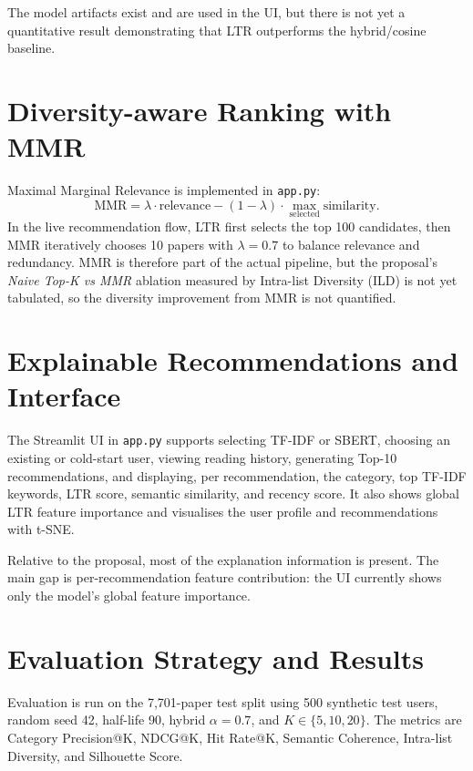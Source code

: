 \documentclass[12pt,a4paper]{article}
\begin{document}
The model artifacts exist and are used in the UI, but there is not yet a
quantitative result demonstrating that LTR outperforms the hybrid/cosine
baseline.

\section{Diversity-aware Ranking with MMR}

Maximal Marginal Relevance is implemented in \texttt{app.py}:
\begin{equation}
\text{MMR} = \lambda \cdot \text{relevance}
- (1-\lambda)\cdot \max_{\text{selected}} \text{similarity}.
\end{equation}
In the live recommendation flow, LTR first selects the top 100 candidates, then
MMR iteratively chooses 10 papers with $\lambda = 0.7$ to balance relevance and
redundancy. MMR is therefore part of the actual pipeline, but the proposal's
\emph{Naive Top-K vs MMR} ablation measured by Intra-list Diversity (ILD) is not
yet tabulated, so the diversity improvement from MMR is not quantified.

\section{Explainable Recommendations and Interface}

The Streamlit UI in \texttt{app.py} supports selecting TF-IDF or SBERT,
choosing an existing or cold-start user, viewing reading history, generating
Top-10 recommendations, and displaying, per recommendation, the category, top
TF-IDF keywords, LTR score, semantic similarity, and recency score. It also
shows global LTR feature importance and visualises the user profile and
recommendations with t-SNE.

Relative to the proposal, most of the explanation information is present. The
main gap is per-recommendation feature contribution: the UI currently shows
only the model's global feature importance.

\section{Evaluation Strategy and Results}

Evaluation is run on the 7{,}701-paper test split using 500 synthetic test
users, random seed 42, half-life 90, hybrid $\alpha=0.7$, and $K\in\{5,10,20\}$.
The metrics are Category Precision@K, NDCG@K, Hit Rate@K, Semantic Coherence,
Intra-list Diversity, and Silhouette Score.
\end{document}
